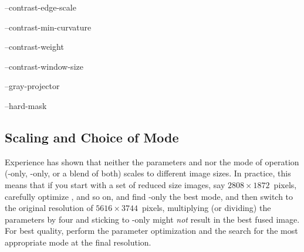 \begin{optionsummary}
\item[--contrast-edge-scale] \sectionName~
\item[--contrast-min-curvature] \sectionName~
\item[--contrast-weight] \sectionName~
\item[--contrast-window-size] \sectionName~
\item[--gray-projector] \sectionName~
\item[--hard-mask] \sectionName~
\end{optionsummary}


\subsection[Scaling and Choice of Mode]{\label{sec:scaling-and-choice}%
  Scaling and Choice of Mode}

Experience has shown that neither the parameters  and  nor
the mode of operation (-only, -only, or a blend of both) scales to
different image sizes.  In practice, this means that if you start with a set of reduced size
images, say $2808 \times 1872$~pixels, carefully optimize ,
 and so on, and find -only the best mode, and then switch to the
original resolution of $5616 \times 3744$~pixels, multiplying (or dividing) the parameters by
four and sticking to -only might \emph{not} result in the best fused image.  For
best quality, perform the parameter optimization and the search for the most appropriate mode at
the final resolution.


